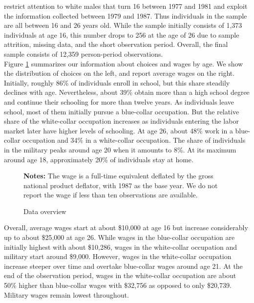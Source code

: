 \noindent \citet{Keane.1997} restrict attention to white males that turn 16 between 1977 and 1981 and exploit the information collected between 1979 and 1987. Thus individuals in the sample are all between 16 and 26 years old. While the sample initially consists of 1,373 individuals at age 16, this number drops to 256 at the age of 26 due to sample attrition, missing data, and the short observation period. Overall, the final sample consists of 12,359 person-period observations.\\

\noindent Figure \ref{Overview} summarizes our information about choices and wages by age. We show the distribution of choices on the left, and report average wages on the right. Initially, roughly 86\% of individuals enroll in school, but this share steadily declines with age. Nevertheless, about 39\% obtain more than a high school degree and continue their schooling for more than twelve years. As individuals leave school, most of them initially pursue a blue-collar occupation. But the relative share of the white-collar occupation increases as individuals entering the labor market later have higher levels of schooling. At age 26, about 48\% work in a blue-collar occupation and 34\% in a white-collar occupation. The share of individuals in the military peaks around age 20 when it amounts to 8\%. At its maximum around age 18, approximately 20\% of individuals stay at home.
%
\begin{figure}[h!]\centering
\caption{Data overview}\label{Overview}
\hspace{0.3cm}
\begin{center}
\begin{minipage}[t]{0.75\columnwidth}
\item \scriptsize{\textbf{Notes:} The wage is a full-time equivalent deflated by the gross national product deflator, with 1987 as the base year. We do not report the wage if less than ten observations are available.}
\end{minipage}
\end{center}
\end{figure}\FloatBarrier
%
\noindent Overall, average wages start at about \$10,000 at age 16 but increase considerably up to about \$25,000 at age 26. While wages in the blue-collar occupation are initially highest with about \$10,286, wages in the white-collar occupation and military start around \$9,000. However, wages in the white-collar occupation increase steeper over time and overtake blue-collar wages around age 21. At the end of the observation period, wages in the white-collar occupation are about 50\% higher than blue-collar wages with \$32,756 as opposed to only \$20,739. Military wages remain lowest throughout.\\

